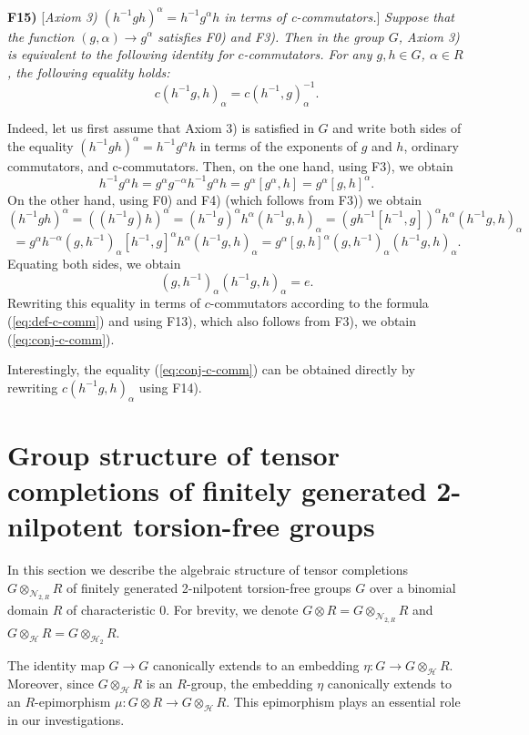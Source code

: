 \documentclass[11pt]{article}
\def\N{{\mathbb N}}
\def\N{{\mathcal{N}}}
\theoremstyle{definition}
\begin{document}
\medskip
\noindent
{\bf F15)} [{\it  Axiom 3) $(h^{-1}gh)^\alpha = h^{-1}g^\alpha h$ in terms of c-commutators.}] {\it Suppose that the function $(g,\alpha) \to g^\alpha$ satisfies F0) and F3). Then in the group $G$, Axiom 3) is equivalent to the following identity for $c$-commutators. For any $g,h \in G$, $\alpha \in R$, the following equality holds:}
\begin{equation} \label{eq:conj-c-comm}
   c(h^{-1}g,h)_\alpha =  c(h^{-1},g)_\alpha^{-1}.
\end{equation}

Indeed, let us first assume that Axiom 3) is satisfied in $G$ and write both sides of the equality $(h^{-1}gh)^\alpha = h^{-1}g^\alpha h$ in terms of the exponents of $g$ and $h$, ordinary commutators, and c-commutators. Then, on the one hand, using F3), we obtain
$$
h^{-1}g^\alpha h = g^\alpha g^{-\alpha}h^{-1}g^\alpha h = g^\alpha [g^\alpha,h] = g^\alpha [g,h]^\alpha.
$$
On the other hand, using F0) and F4) (which follows from F3)) we obtain
$$
(h^{-1}gh)^\alpha  = ((h^{-1}g)h)^\alpha = (h^{-1}g)^\alpha h^\alpha (h^{-1}g,h)_\alpha = (gh^{-1}[h^{-1},g])^\alpha h^\alpha (h^{-1}g,h)_\alpha
$$
$$
= g^\alpha h^{-\alpha} (g,h^{-1})_\alpha [h^{-1},g]^\alpha h^\alpha (h^{-1}g,h)_\alpha = g^\alpha [g,h]^\alpha (g,h^{-1})_\alpha  (h^{-1}g,h)_\alpha.
$$
Equating both sides, we obtain
$$
(g,h^{-1})_\alpha  (h^{-1}g,h)_\alpha = e.
$$
Rewriting this equality in terms of $c$-commutators according to the formula (\ref{eq:def-c-comm}) and using F13), which also follows from F3), we obtain (\ref{eq:conj-c-comm}).


Interestingly, the equality (\ref{eq:conj-c-comm}) can be obtained directly by rewriting $ c(h^{-1}g,h)_\alpha$ using F14).

\section{Group structure of tensor completions of finitely generated 2-nilpotent torsion-free groups}\label{se:main}

In this section we describe the algebraic structure of tensor completions $G \otimes_{\N_{2,R}} R$ of finitely generated 2-nilpotent torsion-free groups $G$ over a binomial domain $R$ of characteristic 0. For brevity, we denote $G \otimes R = G \otimes_{\N_{2,R}} R$ and $G\otimes_{\mathcal{H}} R = G\otimes_{\mathcal{H}_2} R$.

The identity map $G \to G$ canonically extends to an embedding $\eta: G \to G\otimes_{\mathcal{H}} R$. Moreover, since $G\otimes_{\mathcal{H}} R$ is an $R$-group, the embedding $\eta$ canonically extends to an $R$-epimorphism $\mu:G\otimes R \to G\otimes_{\mathcal{H}} R$. This epimorphism plays an essential role in our investigations.
\end{document}
